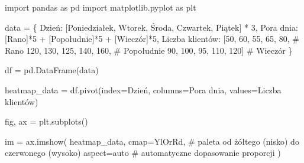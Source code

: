 \documentclass[
  polish,
  letterpaper,
  DIV=11,
  numbers=noendperiod]{scrreprt}
\newenvironment{Shaded}{\begin{snugshade}}{\end{snugshade}}
\newcommand{\CommentTok}[1]{\textcolor[rgb]{0.37,0.37,0.37}{#1}}
\newcommand{\DecValTok}[1]{\textcolor[rgb]{0.68,0.00,0.00}{#1}}
\newcommand{\ImportTok}[1]{\textcolor[rgb]{0.00,0.46,0.62}{#1}}
\newcommand{\NormalTok}[1]{\textcolor[rgb]{0.00,0.23,0.31}{#1}}
\newcommand{\OperatorTok}[1]{\textcolor[rgb]{0.37,0.37,0.37}{#1}}
\newcommand{\StringTok}[1]{\textcolor[rgb]{0.13,0.47,0.30}{#1}}
\begin{document}
\begin{Shaded}
\begin{Highlighting}[]
\ImportTok{import}\NormalTok{ pandas }\ImportTok{as}\NormalTok{ pd}
\ImportTok{import}\NormalTok{ matplotlib.pyplot }\ImportTok{as}\NormalTok{ plt}

\NormalTok{data }\OperatorTok{=}\NormalTok{ \{}
    \StringTok{\textquotesingle{}Dzień\textquotesingle{}}\NormalTok{: [}\StringTok{\textquotesingle{}Poniedziałek\textquotesingle{}}\NormalTok{, }\StringTok{\textquotesingle{}Wtorek\textquotesingle{}}\NormalTok{, }\StringTok{\textquotesingle{}Środa\textquotesingle{}}\NormalTok{, }\StringTok{\textquotesingle{}Czwartek\textquotesingle{}}\NormalTok{, }\StringTok{\textquotesingle{}Piątek\textquotesingle{}}\NormalTok{] }\OperatorTok{*} \DecValTok{3}\NormalTok{,}
    \StringTok{\textquotesingle{}Pora dnia\textquotesingle{}}\NormalTok{: [}\StringTok{\textquotesingle{}Rano\textquotesingle{}}\NormalTok{]}\OperatorTok{*}\DecValTok{5} \OperatorTok{+}\NormalTok{ [}\StringTok{\textquotesingle{}Popołudnie\textquotesingle{}}\NormalTok{]}\OperatorTok{*}\DecValTok{5} \OperatorTok{+}\NormalTok{ [}\StringTok{\textquotesingle{}Wieczór\textquotesingle{}}\NormalTok{]}\OperatorTok{*}\DecValTok{5}\NormalTok{,}
    \StringTok{\textquotesingle{}Liczba klientów\textquotesingle{}}\NormalTok{: [}\DecValTok{50}\NormalTok{, }\DecValTok{60}\NormalTok{, }\DecValTok{55}\NormalTok{, }\DecValTok{65}\NormalTok{, }\DecValTok{80}\NormalTok{,    }\CommentTok{\# Rano}
                        \DecValTok{120}\NormalTok{, }\DecValTok{130}\NormalTok{, }\DecValTok{125}\NormalTok{, }\DecValTok{140}\NormalTok{, }\DecValTok{160}\NormalTok{,  }\CommentTok{\# Popołudnie}
                        \DecValTok{90}\NormalTok{, }\DecValTok{100}\NormalTok{, }\DecValTok{95}\NormalTok{, }\DecValTok{110}\NormalTok{, }\DecValTok{120}\NormalTok{]    }\CommentTok{\# Wieczór}
\NormalTok{\}}

\NormalTok{df }\OperatorTok{=}\NormalTok{ pd.DataFrame(data)}

\NormalTok{heatmap\_data }\OperatorTok{=}\NormalTok{ df.pivot(index}\OperatorTok{=}\StringTok{\textquotesingle{}Dzień\textquotesingle{}}\NormalTok{, columns}\OperatorTok{=}\StringTok{\textquotesingle{}Pora dnia\textquotesingle{}}\NormalTok{, values}\OperatorTok{=}\StringTok{\textquotesingle{}Liczba klientów\textquotesingle{}}\NormalTok{)}

\NormalTok{fig, ax }\OperatorTok{=}\NormalTok{ plt.subplots()}

\NormalTok{im }\OperatorTok{=}\NormalTok{ ax.imshow(}
\NormalTok{    heatmap\_data,}
\NormalTok{    cmap}\OperatorTok{=}\StringTok{\textquotesingle{}YlOrRd\textquotesingle{}}\NormalTok{,      }\CommentTok{\# paleta od żółtego (nisko) do czerwonego (wysoko)}
\NormalTok{    aspect}\OperatorTok{=}\StringTok{\textquotesingle{}auto\textquotesingle{}}       \CommentTok{\# automatyczne dopasowanie proporcji}
\NormalTok{)}


\end{Highlighting}
\end{Shaded}
\end{document}
